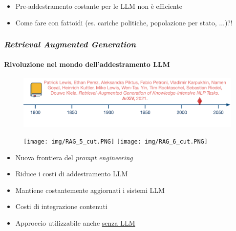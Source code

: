 \begin{frame}[t]
{\begin{minipage}[t]{\textwidth}
\begin{figure}
        \end{figure}
    \end{minipage}
    \begin{minipage}[t]{\textwidth}
        \begin{itemize}[leftmargin=10pt,align=right]
            \item[\alert{\faHandORight}] Pre-addestramento costante per le LLM non è efficiente
            \item[\alert{\faHandORight}] Come fare con \alert{fattoidi} (es. cariche politiche, popolazione per stato, $\ldots$)?!
        \end{itemize}
    \end{minipage}
}
\end{frame}
%
\begin{frame}[t] \frametitle{\emph{Retrieval Augmented Generation}}
{\scriptsize
{}
\framesubtitle{Rivoluzione nel mondo dell'addestramento LLM}
\vspace*{-.5cm}
    \begin{minipage}[t]{\textwidth}
        \begin{figure}[ht]
            \centering
            \includegraphics[width=\textwidth]{img/AI-timeline-2021-2.png}
        \end{figure}
    \end{minipage}
    \begin{minipage}[t]{.60\textwidth}
        \begin{figure}[ht]
            \centering
            \texttt{[image: img/RAG\_5\_cut.PNG]}
            \texttt{[image: img/RAG\_6\_cut.PNG]}
        \end{figure}
    \end{minipage}
    \hfill
    \begin{minipage}[t]{.35\textwidth}
        \begin{itemize}[leftmargin=10pt,align=right]
            \item[\alert{\faHandORight}] Nuova frontiera del \emph{prompt engineering}
            \item[\alert{\faHandORight}] Riduce i costi di addestramento LLM
            \item[\alert{\faHandORight}] Mantiene costantemente aggiornati i sistemi LLM
            \item[\alert{\faHandORight}] Costi di integrazione contenuti
            \item[\alert{\faHandORight}] \alert{Approccio utilizzabile anche \underline{senza LLM}}
        \end{itemize}
    \end{minipage}
}
\end{frame}
